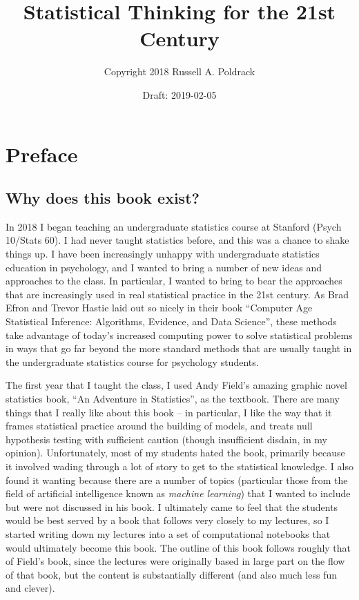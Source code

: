 \documentclass[]{book}
\title{Statistical Thinking for the 21st Century}
\author{Copyright 2018 Russell A. Poldrack}
\date{Draft: 2019-02-05}
\theoremstyle{definition}
\theoremstyle{definition}
\theoremstyle{definition}
\theoremstyle{remark}
\begin{document}
\maketitle

{
\setcounter{tocdepth}{1}
\tableofcontents
}
\chapter*{Preface}\label{preface}

\section{Why does this book exist?}\label{why-does-this-book-exist}

In 2018 I began teaching an undergraduate statistics course at Stanford
(Psych 10/Stats 60). I had never taught statistics before, and this was
a chance to shake things up. I have been increasingly unhappy with
undergraduate statistics education in psychology, and I wanted to bring
a number of new ideas and approaches to the class. In particular, I
wanted to bring to bear the approaches that are increasingly used in
real statistical practice in the 21st century. As Brad Efron and Trevor
Hastie laid out so nicely in their book ``Computer Age Statistical
Inference: Algorithms, Evidence, and Data Science'', these methods take
advantage of today's increased computing power to solve statistical
problems in ways that go far beyond the more standard methods that are
usually taught in the undergraduate statistics course for psychology
students.

The first year that I taught the class, I used Andy Field's amazing
graphic novel statistics book, ``An Adventure in Statistics'', as the
textbook. There are many things that I really like about this book -- in
particular, I like the way that it frames statistical practice around
the building of models, and treats null hypothesis testing with
sufficient caution (though insufficient disdain, in my opinion).
Unfortunately, most of my students hated the book, primarily because it
involved wading through a lot of story to get to the statistical
knowledge. I also found it wanting because there are a number of topics
(particular those from the field of artificial intelligence known as
\emph{machine learning}) that I wanted to include but were not discussed
in his book. I ultimately came to feel that the students would be best
served by a book that follows very closely to my lectures, so I started
writing down my lectures into a set of computational notebooks that
would ultimately become this book. The outline of this book follows
roughly that of Field's book, since the lectures were originally based
in large part on the flow of that book, but the content is substantially
different (and also much less fun and clever).
\end{document}
